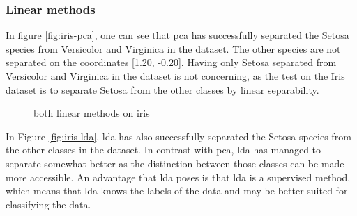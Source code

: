 \subsubsection{Linear methods}\label{subsubsec:linear-methods-on-iris}
In figure \ref{fig:iris-pca}, one can see that \gls{pca} has successfully separated the Setosa species from Versicolor and Virginica in the dataset. The other species are not separated on the coordinates [1.20, -0.20]. Having only Setosa separated from Versicolor and Virginica in the dataset is not concerning, as the test on the Iris dataset is to separate Setosa from the other classes by linear separability.

\begin{figure}
    \centering
    \qquad
    \caption{both linear methods on iris}
    \label{fig:linear-methods-iris}
\end{figure}

In Figure \ref{fig:iris-lda}, \gls{lda} has also successfully separated the Setosa species from the other classes in the dataset. In contrast with \gls{pca}, \gls{lda} has managed to separate somewhat better as the distinction between those classes can be made more accessible. An advantage that \gls{lda} poses is that \gls{lda} is a supervised method, which means that  \gls{lda} knows the labels of the data and may be better suited for classifying the data.



